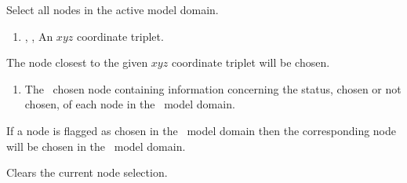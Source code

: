     {Select all nodes in the active model domain.
     }

    {
        \squish
        \begin{enumerate}
        \item {}, ,   An $xyz$ coordinate triplet.
        \end{enumerate}
        The node closest to the given $xyz$ coordinate triplet will be chosen.
    }

    {
        \squish
        \begin{enumerate}
        \item {}  The \gb\ chosen node  containing information concerning the status, chosen or not chosen, of each node in the \gb\ model domain.
        \end{enumerate}
          If a node is flagged as chosen in the \gb\ model domain then the corresponding node will be chosen in the \mfus\ model domain.
    }

    {Clears the current node selection.
     }


